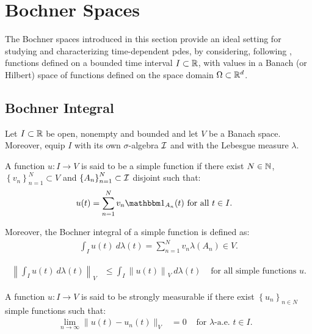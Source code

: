 \section{Bochner Spaces}

The Bochner spaces introduced in this section provide an ideal setting for studying and characterizing time-dependent \acrshort{pdes}, by considering, following \cite[p.~111]{Ern2021}, functions defined on a bounded time interval $I \subset \mathbb{R}$, with values in a Banach (or Hilbert) space of functions defined on the space domain $\Omega \subset \mathbb{R}^{d}$.

\subsection{Bochner Integral}

Let $I \subset \mathbb{R}$ be open, nonempty and bounded and let $V$ be a Banach space. Moreover, equip $I$ with its own $\sigma$-algebra $\mathcal{I}$ and with the Lebesgue measure $\lambda$.

\begin{definition}
    A function $u\colon I \rightarrow V$ is said to be a simple function if there exist $N \in \mathbb{N}$, $\left\{ v_n \right\}_{n = 1}^N \subset V$ and $\left\{ A_n \right\}_{n = 1}^N \subset \mathcal{I}$ disjoint such that:
    \begin{align}
        u(t) = \sum_{n = 1}^N v_n \Characteristic{A_n}(t) &\text{ for all } t \in I.
    \end{align}

    Moreover, the Bochner integral of a simple function is defined as:
    \begin{align}
        \int_I u(t) ~ d \lambda(t)  = \sum_{n = 1}^N v_n \lambda(A_n) \in V.
    \end{align}
\end{definition}

\begin{lemma} %
    \begin{align}
        \left\lVert \int_I u(t) ~ d \lambda(t) \right\rVert_V &\leq \int_I \left\lVert u(t) \right\rVert_V ~ d \lambda(t) &\text{ for all simple functions } u.
    \end{align}
\end{lemma}

\begin{definition}
    A function $u\colon I \rightarrow V$ is said to be strongly measurable if there exist $\left\{ u_n \right\}_{n \in N}$ simple functions such that:
    \begin{align}
        \lim_{n \rightarrow \infty} \lVert u(t) - u_n(t) \rVert_V &= 0 &\text{ for } \lambda \text{-a.e. } t \in I.
&    \end{align}
\end{definition}

